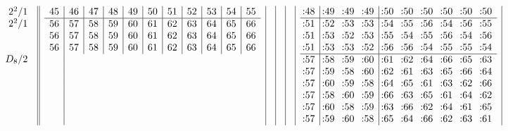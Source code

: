 \documentclass[12pt,a4paper]{amsart}
\begin{document}
\begin{align*}
\begin{array}{r||c|c|c|c|c|c|c|c|c}
    \begin{array}{r}
      2^2/1 \\ 2^2/1 \\ \\ \\ D_8/2 \\ \\ \\ \\ \\ \\
    \end{array}
&
  \begin{array}{r|r|r|r|r|r|r|r|r|r|r}%
45&46&47&48&49&50&51&52&53&54&55\\%
\hline
56&57&58&59&60&61&62&63&64&65&66\\%
56&57&58&59&60&61&62&63&64&65&66\\%
56&57&58&59&60&61&62&63&64&65&66\\%
\\ \\ \\ \\ \\ \\
\end{array}
&&&&
\begin{array}{r|rrr|rrrrrr}%
\llap:48&\llap:49&\llap:49&\llap:49&\llap:50&\llap:50&\llap:50&\llap:50&\llap:50&\llap:50\\%
\hline
\llap:51&\llap:52&\llap:53&\llap:53&\llap:54&\llap:55&\llap:56&\llap:54&\llap:56&\llap:55\\%
\llap:51&\llap:53&\llap:52&\llap:53&\llap:55&\llap:54&\llap:55&\llap:56&\llap:54&\llap:56\\%
\llap:51&\llap:53&\llap:53&\llap:52&\llap:56&\llap:56&\llap:54&\llap:55&\llap:55&\llap:54\\%
\hline
\llap:57&\llap:58&\llap:59&\llap:60&\llap:61&\llap:62&\llap:64&\llap:66&\llap:65&\llap:63\\%
\llap:57&\llap:59&\llap:58&\llap:60&\llap:62&\llap:61&\llap:63&\llap:65&\llap:66&\llap:64\\%
\llap:57&\llap:60&\llap:59&\llap:58&\llap:64&\llap:65&\llap:61&\llap:63&\llap:62&\llap:66\\%
\llap:57&\llap:58&\llap:60&\llap:59&\llap:66&\llap:63&\llap:65&\llap:61&\llap:64&\llap:62\\%
\llap:57&\llap:60&\llap:58&\llap:59&\llap:63&\llap:66&\llap:62&\llap:64&\llap:61&\llap:65\\%
\llap:57&\llap:59&\llap:60&\llap:58&\llap:65&\llap:64&\llap:66&\llap:62&\llap:63&\llap:61\\%

\end{array}
\end{array}
\end{align*}
\end{document}
